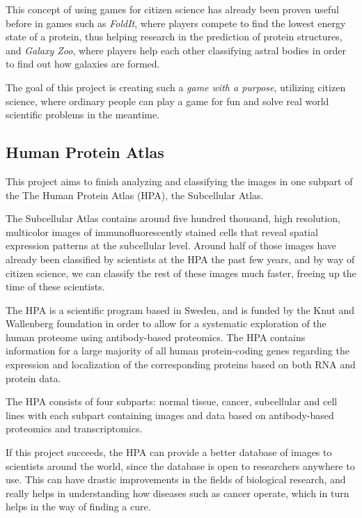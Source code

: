	This concept of using games for citizen science has already been proven useful before in games such as \emph{FoldIt}, where players compete to find the lowest energy state of a protein, thus helping research in the prediction of protein structures, and \emph{Galaxy Zoo}, where players help each other classifying astral bodies in order to find out how galaxies are formed.

	The goal of this project is creating such a \emph{game with a purpose}, utilizing citizen science, where ordinary people can play a game for fun and solve real world scientific problems in the meantime.


\subsection{Human Protein Atlas}

	This project aims to finish analyzing and classifying the images in one subpart of the The Human Protein Atlas (HPA), the Subcellular Atlas.

	The Subcellular Atlas contains around five hundred thousand, high resolution, multicolor images of immunofluorescently stained cells that reveal spatial expression patterns at the subcellular level. Around half of those images have already been classified by scientists at the HPA the past few years, and by way of citizen science, we can classify the rest of these images much faster, freeing up the time of these scientists.

	The HPA is a scientific program based in Sweden, and is funded by the Knut and Wallenberg foundation in order to allow for a systematic exploration of the human proteome using antibody-based proteomics. The HPA contains information for a large majority of all human protein-coding genes regarding the expression and localization of the corresponding proteins based on both RNA and protein data.

	The HPA consists of four subparts: normal tissue, cancer, subcellular and cell lines with each subpart containing images and data based on antibody-based proteomics and transcriptomics.

	If this project succeeds, the HPA can provide a better database of images to scientists around the world, since the database is open to researchers anywhere to use. This can have drastic improvements in the fields of biological research, and really helps in understanding how diseases such as cancer operate, which in turn helps in the way of finding a cure. 

